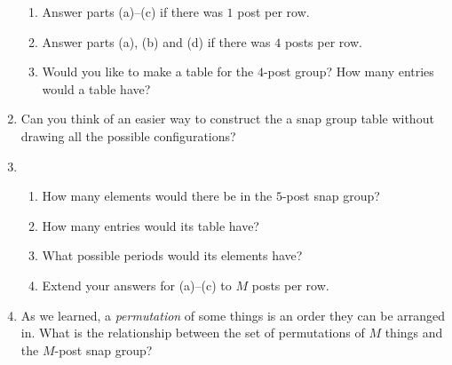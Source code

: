 \documentclass[../gatm.tex]{subfiles}
\begin{document}
\begin{enumerate}
\begin{enumerate}
\item Answer parts (a)--(c) if there was $1$ post per row.
\item Answer parts (a), (b) and (d) if there was $4$ posts per row.
\item Would you like to make a table for the $4$-post group? How many entries would a table have?
\end{enumerate}
\item Can you think of an easier way to construct the a snap group table without drawing all the possible configurations?
\item \begin{enumerate}
\item How many elements would there be in the $5$-post snap group?
\item How many entries would its table have?
\item What possible periods would its elements have?
\item Extend your answers for (a)--(c) to $M$ posts per row.
\end{enumerate}
\item As we learned, a \textit{permutation} of some things is an order they can be arranged in. What is the relationship between the set of permutations of $M$ things and the $M$-post snap group?
\end{enumerate}
\end{document}
